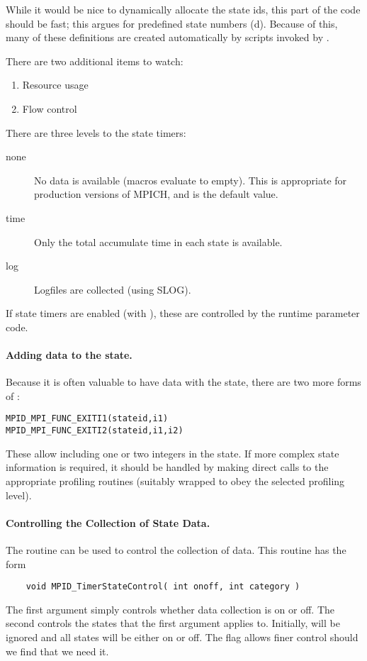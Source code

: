 \documentclass{article}
\begin{document}
While it would be nice to dynamically allocate the state ids, this part of the
code should be fast; this argues for predefined state numbers
(d).  Because of this, many of these definitions are
created automatically by scripts invoked by .

There are two additional items to watch:
\begin{enumerate}
\item Resource usage
\item Flow control
\end{enumerate}

There are three levels to the state timers:
\begin{description}
\item[none]No data is available (macros evaluate to empty).  This is
  appropriate for production versions of MPICH, and is the default value.
\item[time]Only the total accumulate time in each state is available.
\item[log]Logfiles are collected (using SLOG).
\end{description}
If state timers are enabled (with ), these are
controlled by the runtime parameter code.

\paragraph{Adding data to the state.}
Because it is often valuable to have data with the state, there are
two more forms of :
\begin{verbatim}
MPID_MPI_FUNC_EXITI1(stateid,i1)
MPID_MPI_FUNC_EXITI2(stateid,i1,i2)
\end{verbatim}
These allow including one or two integers in the state.  If more
complex state information is required, it should be handled by making
direct calls to the appropriate profiling routines (suitably wrapped
to obey the selected profiling level).

\paragraph{Controlling the Collection of State Data.}
The routine  can be used to control the
collection of data.  This routine has the form
\begin{verbatim}
    void MPID_TimerStateControl( int onoff, int category )
\end{verbatim}
The first argument simply controls whether data collection is on or
off.  The second controls the states that the first argument applies
to.  Initially,  will be ignored and all states will be
either on or off.  The  flag allows finer control
should we find that we need it.
\end{document}
